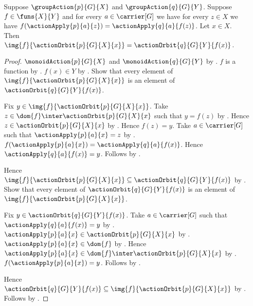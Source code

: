 \begin{theorem}\label{equivariant_map_carries_orbit_onto_orbit}
    Suppose $\groupAction{p}{G}{X}$ and $\groupAction{q}{G}{Y}$.
    Suppose $f\in\funs{X}{Y}$ and for every $a\in\carrier[G]$
        we have for every $z\in X$ we have
            $f(\actionApply{p}{a}{z})=\actionApply{q}{a}{f(z)}$.
    Let $x\in X$.
    Then
        $\img{f}{\actionOrbit{p}{G}{X}{x}}
            =\actionOrbit{q}{G}{Y}{f(x)}$.
\end{theorem}
\begin{proof}
    $\monoidAction{p}{G}{X}$ and $\monoidAction{q}{G}{Y}$ by
        .
    $f$ is a function by .
    $f(x)\in Y$ by .
    Show that every element of
        $\img{f}{\actionOrbit{p}{G}{X}{x}}$ is an element of
        $\actionOrbit{q}{G}{Y}{f(x)}$.
    \begin{subproof}
        Fix $y\in\img{f}{\actionOrbit{p}{G}{X}{x}}$.
        Take $z\in\dom{f}\inter\actionOrbit{p}{G}{X}{x}$ such that
            $y=f(z)$ by
            .
        Hence $z\in\actionOrbit{p}{G}{X}{x}$ by .
        Hence $f(z)=y$.
        Take $a\in\carrier[G]$ such that
            $\actionApply{p}{a}{x}=z$ by .
        $f(\actionApply{p}{a}{x})=\actionApply{q}{a}{f(x)}$.
        Hence $\actionApply{q}{a}{f(x)}=y$.
        Follows by .
    \end{subproof}
    Hence $\img{f}{\actionOrbit{p}{G}{X}{x}}\subseteq
        \actionOrbit{q}{G}{Y}{f(x)}$ by .
    Show that every element of $\actionOrbit{q}{G}{Y}{f(x)}$
        is an element of $\img{f}{\actionOrbit{p}{G}{X}{x}}$.
    \begin{subproof}
        Fix $y\in\actionOrbit{q}{G}{Y}{f(x)}$.
        Take $a\in\carrier[G]$ such that
            $\actionApply{q}{a}{f(x)}=y$ by .
        $\actionApply{p}{a}{x}\in\actionOrbit{p}{G}{X}{x}$ by
            .
        $\actionApply{p}{a}{x}\in\dom{f}$ by
            .
        Hence $\actionApply{p}{a}{x}\in
            \dom{f}\inter\actionOrbit{p}{G}{X}{x}$ by
            .
        $f(\actionApply{p}{a}{x})=y$.
        Follows by .
    \end{subproof}
    Hence $\actionOrbit{q}{G}{Y}{f(x)}\subseteq
        \img{f}{\actionOrbit{p}{G}{X}{x}}$ by .
    Follows by .
\end{proof}

